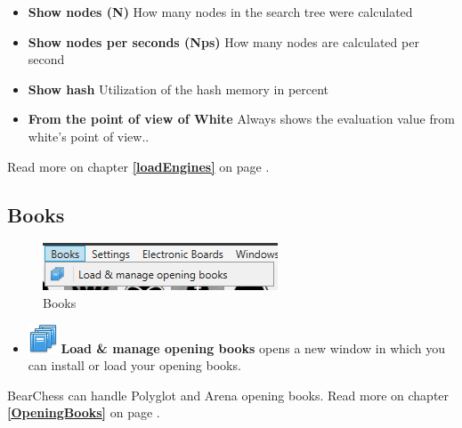 \documentclass[11pt,a4paper]{article}
\begin{document}
\begin{itemize}
	\item  \textbf{Show nodes (N)} How many nodes in the search tree were calculated
	\item \textbf{Show nodes per seconds (Nps)} How many nodes are calculated per second
	\item \textbf{Show hash} Utilization of the hash memory in percent
	\item \textbf{From the point of view of White} Always shows the evaluation value from white's point of view..
\end{itemize}

Read more on chapter \textbf{\ref{loadEngines}  } on page \pageref{loadEngines}.

\subsection{Books}
\begin{figure}[H]
	\centering
	\includegraphics[scale=1.0]{Books.png}
	\caption{Books}
	\label{fig:Books}
\end{figure}
\begin{itemize}
	\item \includegraphics[scale=0.5]{books_stack.png} \textbf{Load \& manage opening books} opens a new window in which you can install or load  your opening books.
\end{itemize}
BearChess can handle Polyglot and Arena opening books. Read more on chapter \textbf{\ref{OpeningBooks}  } on page \pageref{OpeningBooks}.
\end{document}
